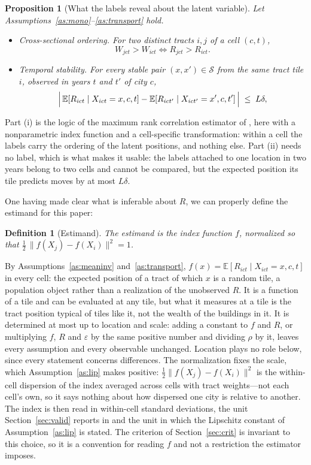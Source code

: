 \documentclass[11pt]{article}
\newtheorem{proposition}{Proposition}
\newtheorem{definition}{Definition}
\theoremstyle{remark}
\newcommand{\E}{\mathbb{E}}
\newcommand{\Ss}{\mathcal{S}}
\begin{document}
\begin{proposition}[What the labels reveal about the latent variable]\label{prop:implications}
Let Assumptions~\ref{as:mono}--\ref{as:transport} hold.
\begin{itemize}
\item[\textbf{(i)}] \emph{Cross-sectional ordering.} For two distinct tracts $i,j$ of a cell $(c,t)$,
\[
    W_{jct} > W_{ict} \iff R_{jct} > R_{ict}.
\]
\item[\textbf{(ii)}] \emph{Temporal stability.} For every stable pair $(x,x')\in\Ss$ from the same tract tile $i$, observed in years $t$ and $t'$ of city $c$,
\[
    \Bigl|\, \E[R_{ict}\mid X_{ict}=x,c,t] - \E[R_{ict'}\mid X_{ict'}=x',c,t'] \,\Bigr| \;\le\; L\delta ,
\]
\end{itemize}
\end{proposition}

Part (i) is the logic of the maximum rank correlation estimator of \citet{han1987}, here with a
nonparametric index function and a cell-specific transformation: within a cell the labels carry the
ordering of the latent positions, and nothing else. Part (ii) needs no label, which is what makes it
usable: the labels attached to one location in two years belong to two cells and cannot be compared,
but the expected position its tile predicts moves by at most $L\delta$.

One having made clear what is inferable about $R$, we can properly define the estimand for this paper:

\begin{definition}[Estimand]\label{def:estimand}
The estimand is the index function $f$, normalized so that $\tfrac12\,\|f(X_j)-f(X_i)\|^{2} = 1$.
\end{definition}

By Assumptions~\ref{as:meaninv} and~\ref{as:transport}, $f(x) = \E[R_{ict}\mid X_{ict}=x, c, t]$ in
every cell: the expected position of a tract of which $x$ is a random tile, a population object rather
than a realization of the unobserved $R$. It is a function of a tile and can be evaluated at any tile,
but what it measures at a tile is the tract position typical of tiles like it, not the wealth of the
buildings in it. It is determined at most up to location and scale: adding a constant to $f$ and $R$,
or multiplying $f$, $R$ and $\varepsilon$ by the same positive number and dividing $\rho$ by it, leaves
every assumption and every observable unchanged. Location plays no role below, since every statement
concerns differences. The normalization fixes the scale, which Assumption~\ref{as:lip} makes positive:
$\tfrac12\|f(X_j)-f(X_i)\|^{2}$ is the within-cell dispersion of the index averaged across cells with
tract weights---not each cell's own, so it says nothing about how dispersed one city is relative to
another. The index is then read in within-cell standard deviations, the unit Section~\ref{sec:valid}
reports in and the unit in which the Lipschitz constant of Assumption~\ref{as:lip} is stated. The
criterion of Section~\ref{sec:crit} is invariant to this choice, so it is a convention for reading $f$
and not a restriction the estimator imposes.
\end{document}
